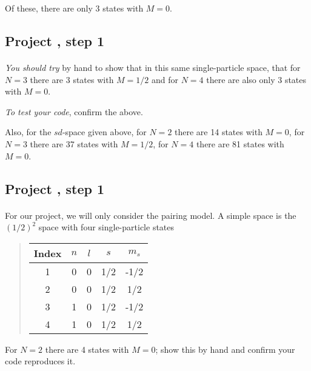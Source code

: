 \documentclass[%
twoside,                 %
final,                   %
10pt]{article}
\begin{document}
\noindent
Of these, there are only 3 states with $M=0$.



\subsection*{Project , step 1}

\paragraph{}
\emph{You should try} by hand to show that in this same single-particle space, that for 
$N=3$ there are 3 states with $M=1/2$ and for $N= 4$ there are also only 3 states with $M=0$. 

\emph{To test your code}, confirm the above. 

Also, 
for the $sd$-space given above, for $N=2$ there are 14 states with $M=0$, for $N=3$ there are 37 
states with $M=1/2$, for $N=4$ there are 81 states with $M=0$.



\subsection*{Project , step 1}

\paragraph{}
For our project, we will only consider the pairing model.
A simple space is the $(1/2)^2$ space with four single-particle states


\begin{quote}
\begin{tabular}{ccccc}
\hline
\multicolumn{1}{c}{ Index } & \multicolumn{1}{c}{ $n$ } & \multicolumn{1}{c}{ $l$ } & \multicolumn{1}{c}{ $s$ } & \multicolumn{1}{c}{ $m_s$ } \\
\hline
1     & 0   & 0   & 1/2 & -1/2  \\
2     & 0   & 0   & 1/2 & 1/2   \\
3     & 1   & 0   & 1/2 & -1/2  \\
4     & 1   & 0   & 1/2 & 1/2   \\
\hline
\end{tabular}
\end{quote}

\noindent
For $N=2$ there are 4 states with $M=0$; show this by hand and confirm your code reproduces it.
\end{document}

